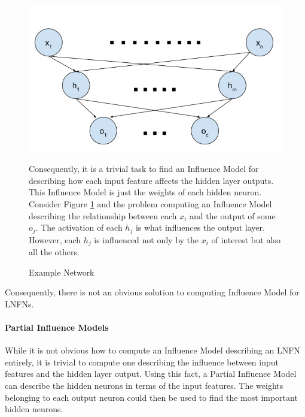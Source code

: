 \begin{figure}[H]
	\centering
	\begin{minipage}[t]{0.5\textwidth}
		\vspace{0px}
		\includegraphics[width=\textwidth]{NetworkExample.png}
		\caption{Example Network}
		\label{fig:network-example}
	\end{minipage}
	\hspace{1px}
	\begin{minipage}[t]{0.45\textwidth}
		\vspace{2px}
		Consequently, it is a trivial task to find an Influence Model for describing how each input feature affects the hidden layer outputs. This Influence Model is just the weights of each hidden neuron. Consider Figure \ref{fig:network-example}  and the problem computing an Influence Model describing the relationship between each $x_i$ and the output of some $o_j$. The activation of each $h_j$ is what influences the output layer. However, each $h_j$ is influenced not only by the $x_i$ of interest but also all the others.
	\end{minipage}
	\hfill
\end{figure}

Consequently, there is not an obvious solution to computing Influence Model for LNFNs.

\paragraph{Partial Influence Models}
While it is not obvious how to compute an Influence Model describing an LNFN entirely, it is trivial to compute one describing the influence between input features and the hidden layer output. Using this fact, a Partial Influence Model can describe the hidden neurons in terms of the input features. The weights belonging to each output neuron could then be used to find the most important hidden neurons.

